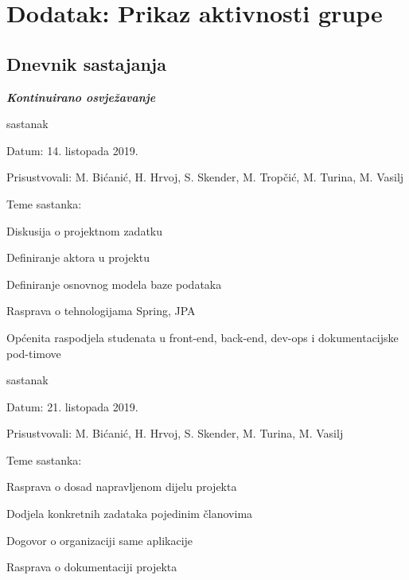 \chapter*{Dodatak: Prikaz aktivnosti grupe}
		
		\section*{Dnevnik sastajanja}
		
		\textbf{\textit{Kontinuirano osvježavanje}}\\
		
		
		\begin{packed_enum}
			\item  sastanak
			
			\item[] \begin{packed_item}
				\item Datum: 14. listopada 2019.
				\item Prisustvovali: M. Bićanić, H. Hrvoj, S. Skender, M. Tropčić, M. Turina, M. Vasilj 
				\item Teme sastanka:
				\begin{packed_item}
					\item  Diskusija o projektnom zadatku
					\item  Definiranje aktora u projektu
					\item  Definiranje osnovnog modela baze podataka
					\item  Rasprava o tehnologijama Spring, JPA
					\item  Općenita raspodjela studenata u front-end, back-end, dev-ops i dokumentacijske pod-timove
				\end{packed_item}
			\end{packed_item}
			
			\item  sastanak
			\item[] \begin{packed_item}
				\item Datum: 21. listopada 2019.
				\item Prisustvovali: M. Bićanić, H. Hrvoj, S. Skender, M. Turina, M. Vasilj
				\item Teme sastanka:
				\begin{packed_item}
					\item  Rasprava o dosad napravljenom dijelu projekta
					\item  Dodjela konkretnih zadataka pojedinim članovima
					\item  Dogovor o organizaciji same aplikacije
					\item  Rasprava o dokumentaciji projekta
				\end{packed_item}
			\end{packed_item}
		

\end{packed_enum}
